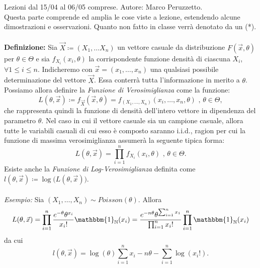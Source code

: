 Lezioni dal 15/04 al 06/05 comprese. Autore: Marco Peruzzetto.\\
Questa parte comprende ed amplia le cose viste a lezione, estendendo alcune dimostrazioni e osservazioni. Quanto non fatto in classe verrà denotato da un (*).\\
\\
\textbf{Definizione:} Sia $\vec{X}\coloneqq (X_1,\ldots X_n)$ un vettore casuale da distribuzione $F(\vec{x}, \theta)$ per $\theta\in \Theta$ e sia $f_{X_i}(x_i,\theta)$ la corrispondente funzione densità di ciascuna $X_i$, $\forall 1\leq i\leq n$. Indicheremo con $\vec{x}=(x_1,\ldots,x_n)$ una qualsiasi possibile determinazione del vettore $\vec{X}$. Essa conterrà tutta l'informazione in merito a $\theta$. Possiamo allora definire la \textit{Funzione di Verosimiglianza} come la funzione:
$$L\left(\theta, \vec{x}\right)\coloneqq f_{\vec{X}}(\vec{x},\theta)=f_{(X_1,\ldots,X_n)}(x_i,\ldots,x_n,\theta)\mbox{ , } \theta\in \Theta, $$ che rappresenta quindi la funzione di densità dell'intero vettore in dipendenza del parametro $\theta$. Nel caso in cui il vettore casuale sia un campione casuale, allora tutte le variabili casuali di cui esso è composto saranno i.i.d., ragion per cui la funzione di massima verosimiglianza assumerà la seguente tipica forma:
$$L\left(\theta, \vec{x}\right)=\prod_{i=1}^n f_{X_i}\left(x_i, \theta\right) \mbox{ , } \theta\in \Theta.$$
Esiste anche la \textit{Funzione di Log-Verosimiglianza} definita come $l(\theta,\vec{x})\coloneqq \log\big(L(\theta, \vec{x})\big)$. 
\\ 
\\
\textit{Esempio:} Sia $(X_1,\ldots,X_n)\sim Poisson(\theta)$. Allora $$L(\theta, \vec{x})=\prod_{i=1}^n \frac{e^{-\theta}\theta^{x_i}}{x_i !}\mathbbm{1}_{\mathbb{N}}(x_i)=\frac{e^{-n\theta}\theta^{\sum_{i=1}^n x_1}}{\prod_{i=1}^n x_i !}\prod_{i=1}^n \mathbbm{1}_{\mathbb{N}}(x_i)$$ da cui $$l(\theta, \vec{x})=\log(\theta)\sum_{i=1}^n x_i   -n\theta - \sum_{i=1}^n \log(x_i !).$$ 
\\ \\
